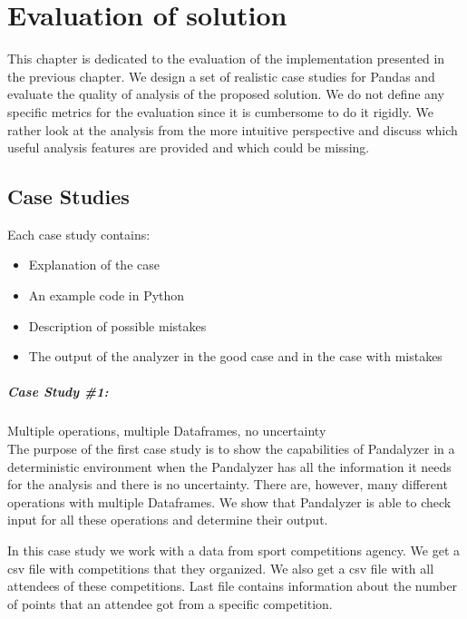 \chapter{Evaluation of solution}\label{ch:evaluation-of-solution}

This chapter is dedicated to the evaluation of the implementation presented in the previous chapter.
We design a set of realistic case studies for Pandas and evaluate the quality of analysis of the proposed solution.
We do not define any specific metrics for the evaluation since it is cumbersome to do it rigidly.
We rather look at the analysis from the more intuitive perspective and discuss which useful analysis features are
provided and which could be missing.

\section{Case Studies}

Each case study contains:
\begin{itemize}
    \item Explanation of the case
    \item An example code in Python
    \item Description of possible mistakes
    \item The output of the analyzer in the good case and in the case with mistakes
\end{itemize}

\paragraph{Case Study \#1:} Multiple operations, multiple Dataframes, no uncertainty  \\

The purpose of the first case study is to show the capabilities of Pandalyzer in a deterministic environment when
the Pandalyzer has all the information it needs for the analysis and there is no uncertainty.
There are, however, many different operations with multiple Dataframes.
We show that Pandalyzer is able to check input for all these operations and determine their output.

In this case study we work with a data from sport competitions agency.
We get a csv file with competitions that they organized.
We also get a csv file with all attendees of these competitions.
Last file contains information about the number of points that an attendee got from a specific competition.

